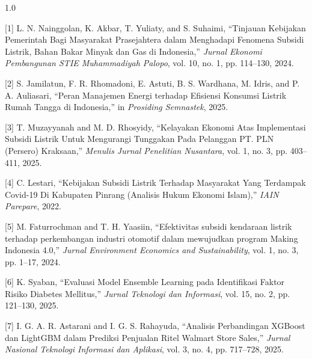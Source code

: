 \documentclass[12pt, a4paper, onecolumn, oneside]{report}
\begin{document}
\vspace{0.5cm}
\begin{spacing}{1.0}

\noindent\hangindent=1.5cm
{[1]} L. N. Nainggolan, K. Akbar, T. Yuliaty, and S. Suhaimi, ``Tinjauan Kebijakan Pemerintah Bagi Masyarakat Prasejahtera dalam Menghadapi Fenomena Subsidi Listrik, Bahan Bakar Minyak dan Gas di Indonesia,'' \textit{Jurnal Ekonomi Pembangunan STIE Muhammadiyah Palopo}, vol. 10, no. 1, pp. 114--130, 2024.

\vspace{0.3cm}
\noindent\hangindent=1.5cm
{[2]} S. Jamilatun, F. R. Rhomadoni, E. Astuti, B. S. Wardhana, M. Idris, and P. A. Auliasari, ``Peran Manajemen Energi terhadap Efisiensi Konsumsi Listrik Rumah Tangga di Indonesia,'' in \textit{Prosiding Semnastek}, 2025.

\vspace{0.3cm}
\noindent\hangindent=1.5cm
{[3]} T. Muzayyanah and M. D. Rhosyidy, ``Kelayakan Ekonomi Atas Implementasi Subsidi Listrik Untuk Mengurangi Tunggakan Pada Pelanggan PT. PLN (Persero) Kraksaan,'' \textit{Menulis Jurnal Penelitian Nusantara}, vol. 1, no. 3, pp. 403--411, 2025.

\vspace{0.3cm}
\noindent\hangindent=1.5cm
{[4]} C. Lestari, ``Kebijakan Subsidi Listrik Terhadap Masyarakat Yang Terdampak Covid-19 Di Kabupaten Pinrang (Analisis Hukum Ekonomi Islam),'' \textit{IAIN Parepare}, 2022.

\vspace{0.3cm}
\noindent\hangindent=1.5cm
{[5]} M. Faturrochman and T. H. Yaasiin, ``Efektivitas subsidi kendaraan listrik terhadap perkembangan industri otomotif dalam mewujudkan program Making Indonesia 4.0,'' \textit{Jurnal Environment Economics and Sustainability}, vol. 1, no. 3, pp. 1--17, 2024.

\vspace{0.3cm}
\noindent\hangindent=1.5cm
{[6]} K. Syaban, ``Evaluasi Model Ensemble Learning pada Identifikasi Faktor Risiko Diabetes Mellitus,'' \textit{Jurnal Teknologi dan Informasi}, vol. 15, no. 2, pp. 121--130, 2025.

\vspace{0.3cm}
\noindent\hangindent=1.5cm
{[7]} I. G. A. R. Astarani and I. G. S. Rahayuda, ``Analisis Perbandingan XGBoost dan LightGBM dalam Prediksi Penjualan Ritel Walmart Store Sales,'' \textit{Jurnal Nasional Teknologi Informasi dan Aplikasi}, vol. 3, no. 4, pp. 717--728, 2025.


\end{spacing}
\end{document}
